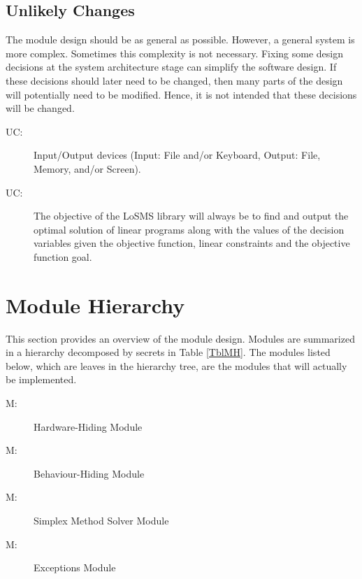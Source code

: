 \documentclass[12pt, titlepage]{article}
\newcounter{ucnum}
\newcommand{\uctheucnum}{UC\theucnum}
\newcounter{mnum}
\newcommand{\mthemnum}{M\themnum}
\newcommand{\famname}{LoSMS} %
\begin{document}
\subsection{Unlikely Changes} \label{SecUchange}

The module design should be as general as possible. However, a general system is
more complex. Sometimes this complexity is not necessary. Fixing some design
decisions at the system architecture stage can simplify the software design. If
these decisions should later need to be changed, then many parts of the design
will potentially need to be modified. Hence, it is not intended that these
decisions will be changed.

\begin{description}
\item[ \uctheucnum \label{ucIO}:] Input/Output devices
  (Input: File and/or Keyboard, Output: File, Memory, and/or Screen).

\item[ \uctheucnum \label{ucObjective}:] The objective of 
the \famname{} library will always be to find and output the optimal 
solution of linear programs along with the values of the decision variables 
given the objective function, linear constraints and the objective function 
goal.
\end{description}

\section{Module Hierarchy} \label{SecMH}

This section provides an overview of the module design. Modules are summarized
in a hierarchy decomposed by secrets in Table \ref{TblMH}. The modules listed
below, which are leaves in the hierarchy tree, are the modules that will
actually be implemented.

\begin{description}
\item [ \mthemnum \label{mHH}:] Hardware-Hiding Module
\item [ \mthemnum \label{mBH}:] Behaviour-Hiding Module
\item [ \mthemnum \label{mSimplex}:] Simplex Method Solver 
Module
\item [ \mthemnum \label{mExceptions}:] Exceptions Module
\end{description}
\end{document}
